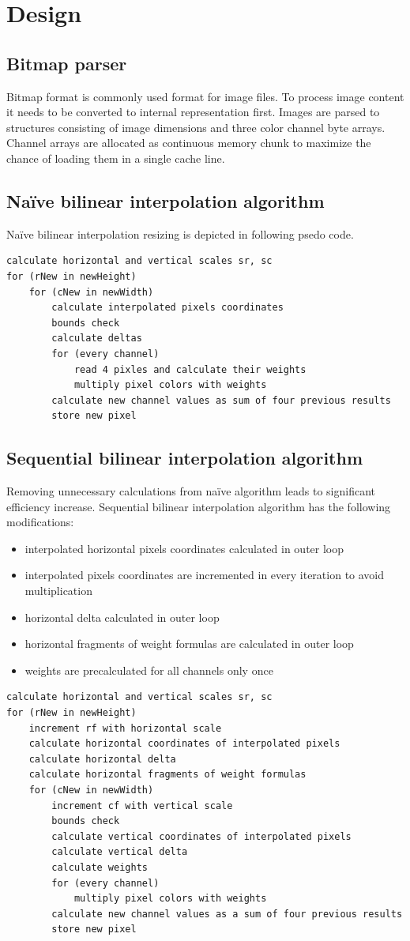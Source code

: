 \documentclass{article}
\begin{document}
\section{Design}
\subsection{Bitmap parser}
Bitmap format is commonly used format for image files. To process image content it needs to be
converted to internal representation first. Images are parsed to structures consisting of
image dimensions and three color channel byte arrays. Channel arrays are allocated as continuous
memory chunk to maximize the chance of loading them in a single cache line.
\subsection{Na\"ive bilinear interpolation algorithm}
Na\"ive bilinear interpolation resizing is depicted in following psedo code.
\begin{lstlisting}
calculate horizontal and vertical scales sr, sc
for (rNew in newHeight)
    for (cNew in newWidth)
        calculate interpolated pixels coordinates
        bounds check
        calculate deltas
        for (every channel)
            read 4 pixles and calculate their weights
            multiply pixel colors with weights
        calculate new channel values as sum of four previous results
        store new pixel
\end{lstlisting}
\newpage
\subsection{Sequential bilinear interpolation algorithm}
Removing unnecessary calculations from na\"ive algorithm leads to significant efficiency increase.
Sequential bilinear interpolation algorithm has the following modifications:
\begin{itemize}
    \item interpolated horizontal pixels coordinates calculated in outer loop
    \item interpolated pixels coordinates are incremented in every iteration to avoid multiplication
    \item horizontal delta calculated in outer loop
    \item horizontal fragments of weight formulas are calculated in outer loop
    \item weights are precalculated for all channels only once
\end{itemize}
\begin{lstlisting}
calculate horizontal and vertical scales sr, sc
for (rNew in newHeight)
    increment rf with horizontal scale
    calculate horizontal coordinates of interpolated pixels
    calculate horizontal delta
    calculate horizontal fragments of weight formulas
    for (cNew in newWidth)
        increment cf with vertical scale
        bounds check
        calculate vertical coordinates of interpolated pixels
        calculate vertical delta
        calculate weights
        for (every channel)
            multiply pixel colors with weights
        calculate new channel values as a sum of four previous results
        store new pixel
\end{lstlisting}
\end{document}
